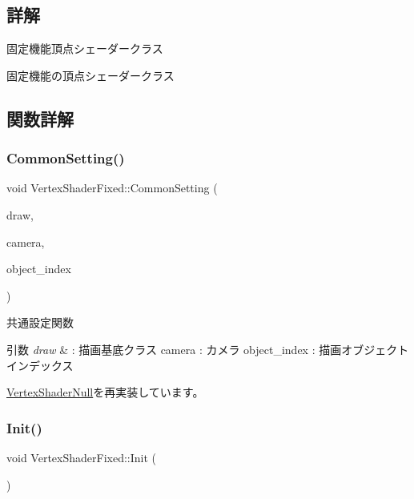 \subsection{詳解}
固定機能頂点シェーダークラス 

固定機能の頂点シェーダークラス 

\subsection{関数詳解}
\mbox{\label{class_vertex_shader_fixed_a82bf2829b6fd0df26faedcbf650ba08d}} 
\subsubsection{\texorpdfstring{Common\+Setting()}{CommonSetting()}}
{\footnotesize\ttfamily void Vertex\+Shader\+Fixed\+::\+Common\+Setting (\begin{DoxyParamCaption}\item[{\mbox{\hyperlink{class_draw_base}{Draw\+Base}} $\ast$}]{draw,  }\item[{\mbox{\hyperlink{class_camera}{Camera}} $\ast$}]{camera,  }\item[{unsigned}]{object\+\_\+index }\end{DoxyParamCaption})\hspace{0.3cm}{\ttfamily [virtual]}}



共通設定関数 


\begin{DoxyParams}{引数}
{\em draw} & \+: 描画基底クラス camera \+: カメラ object\+\_\+index \+: 描画オブジェクトインデックス \\
\hline
\end{DoxyParams}


\mbox{\hyperlink{class_vertex_shader_null_a95f1a66045fb39c42cf0566f1990b6a1}{Vertex\+Shader\+Null}}を再実装しています。

\mbox{\label{class_vertex_shader_fixed_ae829ff736b33c45543804059255125b6}} 
\subsubsection{\texorpdfstring{Init()}{Init()}}
{\footnotesize\ttfamily void Vertex\+Shader\+Fixed\+::\+Init (\begin{DoxyParamCaption}{ }\end{DoxyParamCaption})\hspace{0.3cm}{\ttfamily [virtual]}}




